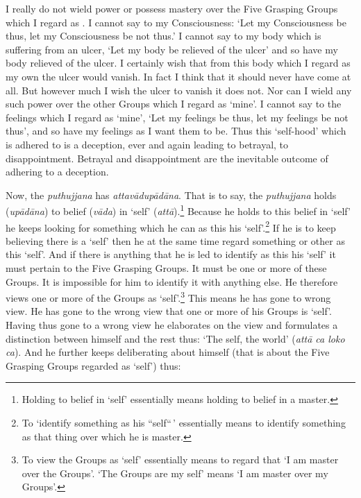 I really do not wield power or possess mastery over the Five Grasping Groups which I regard as . I cannot say to my Consciousness: `Let my Consciousness be thus, let my Consciousness be not thus.' I cannot say to my body which is suffering from an ulcer, `Let my body be relieved of the ulcer' and so have my body relieved of the ulcer. I certainly wish that from this body which I regard as my own the ulcer would vanish. In fact I think that it should never have come at all. But however much I wish the ulcer to vanish it does not. Nor can I wield any such power over the other Groups which I regard as `mine'. I cannot say to the feelings which I regard as `mine', `Let my feelings be thus, let my feelings be not thus', and so have my feelings as I want them to be. Thus this `self-hood' which is adhered to is a deception, ever and again leading to betrayal, to disappointment. Betrayal and disappointment are the inevitable outcome of adhering to a deception.

Now, the \emph{puthujjana} has \emph{attavādupādāna}. That is to say, the \emph{puthujjana} holds (\emph{upādāna}) to belief (\emph{vāda}) in `self' (\emph{attā}).\footnote{Holding to belief in `self' essentially means holding to belief in a master.} Because he holds to this belief in `self' he keeps looking for something which he can  as this his `self'.\footnote{To `identify something as his ``self``\,' essentially means to identify something as that thing over which he is master.} If he is to keep believing there is a `self' then he  at the same time regard something or other as this `self'. And if there is anything that he is led to identify as this his `self' it must pertain to the Five Grasping Groups. It must be one or more of these Groups. It is impossible for him to identify it with anything else. He therefore views one or more of the Groups as `self'.\footnote{To view the Groups as `self' essentially means to regard that `I am master over the Groups'. `The Groups are my self' means `I am master over my Groups'.} This means he has gone to wrong view. He has gone to the wrong view that one or more of his Groups is `self'. Having thus gone to a wrong view he elaborates on the view and formulates a distinction between himself and the rest thus: `The self, the world' (\emph{attā ca loko ca}). And he further keeps deliberating about himself (that is about the Five Grasping Groups regarded as `self') thus:

